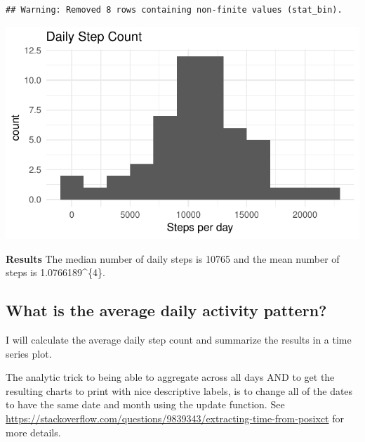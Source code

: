\documentclass[]{article}
\newenvironment{Shaded}{\begin{snugshade}}{\end{snugshade}}
\newcommand{\KeywordTok}[1]{\textcolor[rgb]{0.13,0.29,0.53}{\textbf{#1}}}
\newcommand{\DataTypeTok}[1]{\textcolor[rgb]{0.13,0.29,0.53}{#1}}
\newcommand{\StringTok}[1]{\textcolor[rgb]{0.31,0.60,0.02}{#1}}
\newcommand{\OtherTok}[1]{\textcolor[rgb]{0.56,0.35,0.01}{#1}}
\newcommand{\OperatorTok}[1]{\textcolor[rgb]{0.81,0.36,0.00}{\textbf{#1}}}
\newcommand{\NormalTok}[1]{#1}
\begin{document}
\begin{verbatim}
## Warning: Removed 8 rows containing non-finite values (stat_bin).
\end{verbatim}

\includegraphics{PA1_template_files/figure-latex/dailyStepsHistogram-1.pdf}

\begin{Shaded}
\end{Shaded}

\textbf{Results} The median number of daily steps is 10765 and the mean
number of steps is 1.0766189\^{}\{4\}.

\subsection{What is the average daily activity
pattern?}\label{what-is-the-average-daily-activity-pattern}

I will calculate the average daily step count and summarize the results
in a time series plot.

The analytic trick to being able to aggregate across all days AND to get
the resulting charts to print with nice descriptive labels, is to change
all of the dates to have the same date and month using the update
function. See
\url{https://stackoverflow.com/questions/9839343/extracting-time-from-posixct}
for more details.
\end{document}
